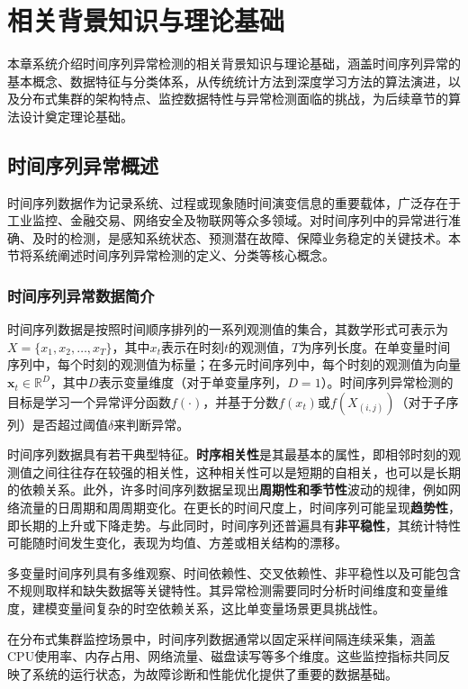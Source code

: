 \chapter{相关背景知识与理论基础}\label{chap:background}

本章系统介绍时间序列异常检测的相关背景知识与理论基础，涵盖时间序列异常的基本概念、数据特征与分类体系，从传统统计方法到深度学习方法的算法演进，以及分布式集群的架构特点、监控数据特性与异常检测面临的挑战，为后续章节的算法设计奠定理论基础。

\section{时间序列异常概述}

时间序列数据作为记录系统、过程或现象随时间演变信息的重要载体，广泛存在于工业监控、金融交易、网络安全及物联网等众多领域。对时间序列中的异常进行准确、及时的检测，是感知系统状态、预测潜在故障、保障业务稳定的关键技术。本节将系统阐述时间序列异常检测的定义、分类等核心概念。

\subsection{时间序列异常数据简介}

时间序列数据是按照时间顺序排列的一系列观测值的集合，其数学形式可表示为$X=\{x_1, x_2, \ldots, x_T\}$，其中$x_t$表示在时刻$t$的观测值，$T$为序列长度。在单变量时间序列中，每个时刻的观测值为标量；在多元时间序列中，每个时刻的观测值为向量$\mathbf{x}_t \in \mathbb{R}^D$，其中$D$表示变量维度（对于单变量序列，$D=1$）。时间序列异常检测的目标是学习一个异常评分函数$f(\cdot)$，并基于分数$f(x_t)$或$f(X_{(i,j)})$（对于子序列）是否超过阈值$\delta$来判断异常。

时间序列数据具有若干典型特征。\textbf{时序相关性}是其最基本的属性，即相邻时刻的观测值之间往往存在较强的相关性，这种相关性可以是短期的自相关，也可以是长期的依赖关系。此外，许多时间序列数据呈现出\textbf{周期性和季节性}波动的规律，例如网络流量的日周期和周周期变化。在更长的时间尺度上，时间序列可能呈现\textbf{趋势性}，即长期的上升或下降走势。与此同时，时间序列还普遍具有\textbf{非平稳性}，其统计特性可能随时间发生变化，表现为均值、方差或相关结构的漂移。

多变量时间序列具有多维观察、时间依赖性、交叉依赖性、非平稳性以及可能包含不规则取样和缺失数据等关键特性。其异常检测需要同时分析时间维度和变量维度，建模变量间复杂的时空依赖关系，这比单变量场景更具挑战性。

在分布式集群监控场景中，时间序列数据通常以固定采样间隔连续采集，涵盖CPU使用率、内存占用、网络流量、磁盘读写等多个维度。这些监控指标共同反映了系统的运行状态，为故障诊断和性能优化提供了重要的数据基础。

